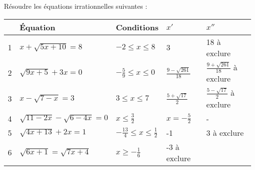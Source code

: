 \begin{landscape}
\begin{solution}
Résoudre les équations irrationnelles suivantes :

\begin{tabular}{|l|l|l|l|l|}
\hline
  & Équation                     & Conditions                          & ${x}'$                    & ${x}''$                             \\ \hline
1 & $x+\sqrt{5x+10}=8$           & $-2\le x\le 8$                      & 3                         & 18 à exclure                        \\ \hline
2 & $\sqrt{9x+5}+3x=0$           & $-\frac{5}{9}\le x\le 0$            & $\frac{9-\sqrt{261}}{18}$ & $\frac{9+\sqrt{261}}{18}$ à exclure \\ \hline
3 & $x-\sqrt{7-x}=3$             & $3\le x\le 7$                       & $\frac{5+\sqrt{17}}{2}$   & $\frac{5-\sqrt{17}}{2}$ à exclure   \\ \hline
4 & $\sqrt{11-2x}-\sqrt{6-4x}=0$ & $x\le \frac{3}{2}$                  & $x=-\frac{5}{2}$          & -                                   \\ \hline
5 & $\sqrt{4x+13}+2x=1$          & $-\frac{13}{4}\le x\le \frac{1}{2}$ & -1                        & 3 à exclure                         \\ \hline
6 & $\sqrt{6x+1}=\sqrt{7x+4}$    & $x\ge -\frac{1}{6}$                 & -3 à exclure              &                                     \\ \hline
\end{tabular}
\end{solution}

\end{landscape}